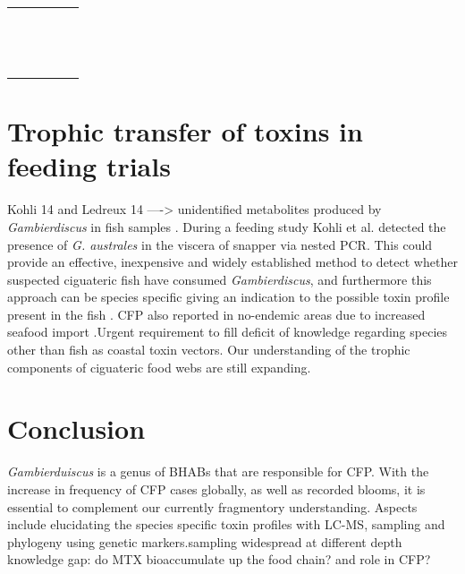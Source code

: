 \documentclass[12pt]{article}
\begin{document}
\begin{longtable}{  p{2cm} p{3cm}  p{4.5cm}  p{2cm}  p{3cm}  }
  & \emph{} &  &  & \\
  &  \emph{} &  &  & \\
  & \emph{}  &  &  & \\
  & \emph{} &  &  & \\
  &  \emph{} &  &  & \\
  & \emph{}  &  &  & \\
  & \emph{} &  &  & \\
  &  \emph{} &  &  & \\
  & \emph{}  &  &  & \\
  & \emph{} &  &  & \\
  &  \emph{} &  &  & \\
  & \emph{}  &  &  & \\
  & \emph{} &  &  & \\
\hline
\end{longtable}

\FloatBarrier

\section{Trophic transfer of toxins in feeding trials}
Kohli 14 and Ledreux 14
----> unidentified metabolites produced by \emph{Gambierdiscus} in fish samples \cite{endean1993variation,vernoux1997isolation}.
During a feeding study Kohli et al. detected the presence of \emph{G. australes} in the viscera of snapper via nested PCR. This could provide an effective, inexpensive and widely established method to detect whether suspected ciguateric fish have consumed \emph{Gambierdiscus}, and furthermore this approach can be species specific giving an indication to the possible toxin profile present in the fish \cite{kohli2014feeding}.
CFP also reported in no-endemic areas due to increased seafood import \cite{glaziou1994epidemiology,ting2001ciguatera}.Urgent requirement to fill deficit of knowledge regarding species other than fish as coastal toxin vectors. 
Our understanding of the trophic components of ciguateric food webs are still expanding.

\section{Conclusion}
\emph{Gambierduiscus} is a genus of BHABs that are responsible for CFP. With the increase in frequency of CFP cases globally, as well as recorded blooms, it is essential to complement our currently fragmentory understanding. Aspects include elucidating the species specific toxin profiles with LC-MS, sampling and phylogeny using genetic markers.sampling widespread at different depth 
knowledge gap: do MTX bioaccumulate up the food chain? and role in CFP?
\newpage



\end{document}
